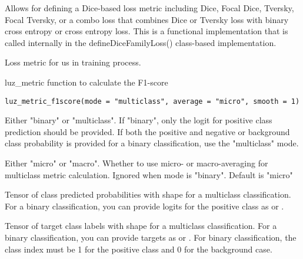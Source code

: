 \documentclass[a4paper]{book}
\begin{document}
%
\begin{Details}\relax
Allows for defining a Dice-based loss metric including Dice, Focal Dice,
Tversky, Focal Tversky, or a combo loss that combines Dice or Tversky loss
with binary cross entropy or cross entropy loss. This is a functional implementation
that is called internally in the defineDiceFamilyLoss() class-based implementation.
\end{Details}
%
\begin{Value}
Loss metric for us in training process.
\end{Value}
%
\begin{Description}\relax
luz\_metric function to calculate the F1-score
\end{Description}
%
\begin{Usage}
\begin{verbatim}
luz_metric_f1score(mode = "multiclass", average = "micro", smooth = 1)
\end{verbatim}
\end{Usage}
%
\begin{Arguments}
\begin{ldescription}
\item[\code{mode}] Either "binary" or "multiclass". If "binary", only the logit for
positive class prediction should be provided. If both the positive and negative
or background class probability is provided for a binary classification, use
the "multiclass" mode.

\item[\code{average}] Either "micro" or "macro". Whether to use micro- or macro-averaging
for multiclass metric calculation. Ignored when mode is "binary". Default is
"micro"

\item[\code{preds}] Tensor of class predicted probabilities with shape
 for a multiclass classification. For a
binary classification, you can provide logits for the positive class as
 or .

\item[\code{target}] Tensor of target class labels with shape
 for a multiclass classification. For a
binary classification, you can provide targets as
 or . For
binary classification, the class index must be 1 for the positive class and 0
for the background case.
\end{ldescription}
\end{Arguments}
\end{document}
